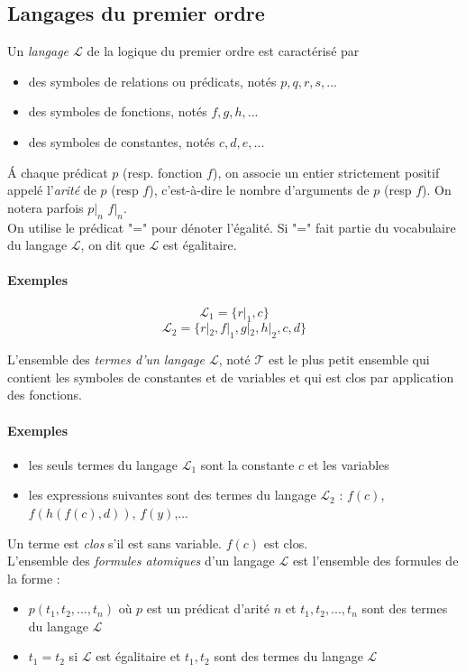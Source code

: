 \documentclass[a4paper]{article}
\begin{document}
  \subsection{Langages du premier ordre}
  Un \textit{langage $\mathcal{L}$} de la logique du premier ordre est 
caractérisé par
  \begin{itemize}
    \item{des symboles de relations ou prédicats, notés $p, q, r, s, 
...$}
    \item{des symboles de fonctions, notés $f, g, h, ...$}
    \item{des symboles de constantes, notés $c, d, e, ...$}
  \end{itemize}
  \'A chaque prédicat $p$ (resp. fonction $f$), on associe un entier 
strictement
  positif appelé l'\textit{arité} de $p$ (resp $f$), c'est-à-dire le 
nombre
  d'arguments de $p$ (resp $f$). On notera parfois $p|_n$ $f|_n$.\\

  On utilise le prédicat "=" pour dénoter l'égalité. Si "=" fait partie 
du 
  vocabulaire du langage $\mathcal{L}$, on dit que $\mathcal{L}$ est 
égalitaire.

  \paragraph{Exemples} 
  $$\mathcal{L}_1 = \{ r|_1, c \}$$
  $$\mathcal{L}_2 = \{ r|_2, f|_1, g|_2, h|_2, c, d \}$$

  L'ensemble des \textit{termes d'un langage $\mathcal{L}$}, noté 
$\mathcal{T}$ est le plus petit
  ensemble qui contient les symboles de constantes et de variables et 
qui est
  clos par application des fonctions.

  \paragraph{Exemples}
  \begin{itemize}
    \item les seuls termes du langage $\mathcal{L}_1$ sont la constante 
$c$ et les variables
    \item les expressions suivantes sont des termes du langage 
$\mathcal{L}_2$ : $f(c)$, $f(h(f(c),d))$, $f(y)$,...
  \end{itemize}
  Un terme est \textit{clos} s'il est sans variable. $f(c)$ est clos.\\

  L'ensemble des \textit{formules atomiques} d'un langage $\mathcal{L}$ 
est l'ensemble
  des formules de la forme :
  \begin{itemize}
    \item $p(t_1, t_2, ..., t_n)$ où $p$ est un prédicat d'arité $n$ et 
$t_1, t_2, ..., t_n$ 
    sont des termes du langage $\mathcal{L}$
    \item $t_1 = t_2$ si $\mathcal{L}$ est égalitaire et $t_1, t_2$ sont 
des termes
    du langage $\mathcal{L}$
  \end{itemize}
\end{document}
